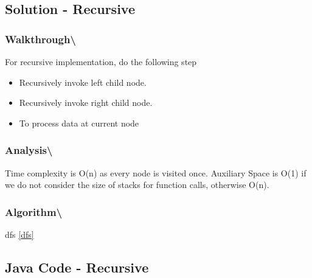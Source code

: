 \documentclass[]{book}
\providecommand{\tightlist}{%
  \setlength{\itemsep}{0pt}\setlength{\parskip}{0pt}}
\begin{document}
\hypertarget{solution---recursive-2}{%
\subsection{Solution - Recursive}\label{solution---recursive-2}}

\hypertarget{walkthrough-73}{%
\subsubsection{Walkthrough\textbackslash{}}\label{walkthrough-73}}

For recursive implementation, do the following step

\begin{itemize}
\tightlist
\item
  Recursively invoke left child node.
\item
  Recursively invoke right child node.
\item
  To process data at current node
\end{itemize}

\hypertarget{analysis-80}{%
\subsubsection{Analysis\textbackslash{}}\label{analysis-80}}

Time complexity is O(n) as every node is visited once. Auxiliary Space is O(1) if we do not consider the size of stacks
for function calls, otherwise O(n).

\hypertarget{algorithm-81}{%
\subsubsection{Algorithm\textbackslash{}}\label{algorithm-81}}

dfs \ref{dfs}

\hypertarget{java-code---recursive-2}{%
\subsection{Java Code - Recursive}\label{java-code---recursive-2}}
\end{document}
